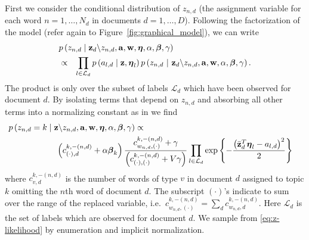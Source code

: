 First we consider the conditional distribution of $z_{n,d}$ (the assignment variable
for each word $n=1,\ldots,N_{d}$ in documents $d=1,\ldots,D$). 
Following the factorization of the model (refer again to Figure~\ref{fig:graphical_model}), we can write
\begin{eqnarray*}
\lefteqn{p\left(z_{n,d}\mid\mathbf{z}_d\backslash z_{n,d},\mathbf{a},\mathbf{w},\mathbf{\boldsymbol\eta},\alpha,\boldsymbol\beta,\gamma\right)}\\
&\propto&\prod_{l\in\mathcal{L}_{d}}p\left(a_{l,d}\mid\mathbf{z},\boldsymbol\eta_{l}\right)p\left(z_{n,d}\ |\ \mathbf{z}_d\backslash z_{n,d},\mathbf{a},\mathbf{w},\alpha,\boldsymbol\beta,\gamma\right).\end{eqnarray*}
 The product is only over the subset of labels $\mathcal{L}_{d}$
which have been observed for document $d$. By isolating terms that
depend on $z_{n,d}$ and absorbing all other terms into a normalizing
constant as in \cite{Griffiths04} we find 
\begin{eqnarray}
\lefteqn{p\left(z_{n,d}=k\mid\mathbf{z}\backslash z_{n,d},\mathbf{a},\mathbf{w},\mathbf{\boldsymbol\eta},\alpha,\boldsymbol\beta,\gamma\right)\propto} \label{eq:z-likelihood} \\
 & \hspace{2cm}\left(c_{\left(\cdot\right),d}^{k,-\left(n,d\right)}+\alpha\boldsymbol\beta_{k}\right)\frac{c_{w_{n,d},\left(\cdot\right)}^{k,-\left(n,d\right)}+\gamma}{\left(c_{\left(\cdot\right),\left(\cdot\right)}^{k,-\left(n,d\right)}+V\gamma\right)}\prod_{l\in\mathcal{L}_{d}}\exp\left\{ -\frac{\left(\bar{\mathbf{z}}_{d}^{T}\boldsymbol\eta_{l}-a_{l,d}\right)^{2}}{2}\right\}\nonumber\end{eqnarray}
 where $c_{v,d}^{k,-\left(n,d\right)}$ is the number
of words of type $v$ in document $d$ assigned to topic $k$ omitting
the $n$th word of document $d$. The subscript $(\cdot)$'s
indicate to sum over the range of the replaced variable, i.e.~$ {c_{w_{n,d},\left(\cdot\right)}^{k,-\left(n,d\right)}} = \sum_d {c_{w_{n,d},d}^{k,-\left(n,d\right)}}$.  Here $\mathcal{L}_{d}$ is the set of labels which are observed for document $d$.  We sample from \eqref{eq:z-likelihood}  by enumeration and implicit normalization.
%


